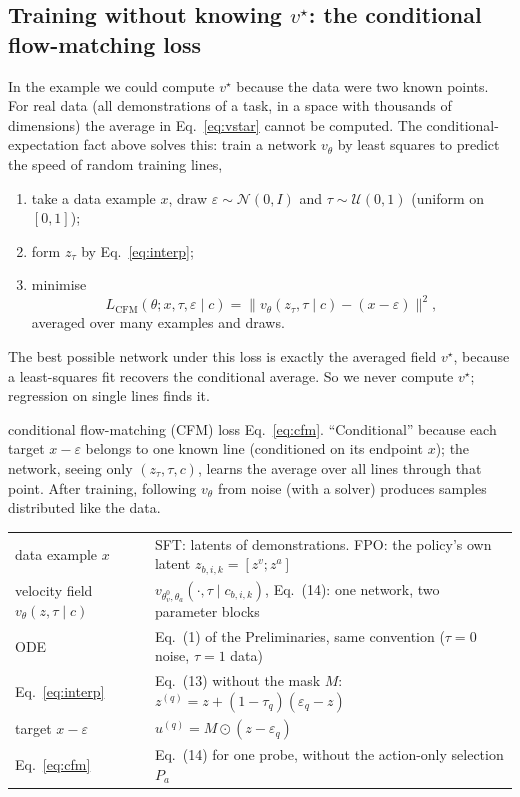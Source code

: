 \documentclass[11pt,a4paper]{article}
\newcommand{\N}{\mathcal{N}}
\newcommand{\Lc}{L_{\mathrm{CFM}}}
\begin{document}
\subsection{Training without knowing $v^\star$: the conditional flow-matching loss}\label{sec:cfm}
In the example we could compute $v^\star$ because the data were two known points. For real data (all demonstrations of a task, in a space with thousands of dimensions) the average in Eq.~\eqref{eq:vstar} cannot be computed. The conditional-expectation fact above solves this: train a network $v_\theta$ by least squares to predict the speed of random training lines,
\begin{enumerate}
\item take a data example $x$, draw $\varepsilon\sim\N(0,I)$ and $\tau\sim\mathcal U(0,1)$ (uniform on $[0,1]$);
\item form $z_\tau$ by Eq.~\eqref{eq:interp};
\item minimise
\begin{equation}
\Lc(\theta;x,\tau,\varepsilon\mid c)=\big\|v_\theta(z_\tau,\tau\mid c)-(x-\varepsilon)\big\|^2 ,
\label{eq:cfm}
\end{equation}
averaged over many examples and draws.
\end{enumerate}
The best possible network under this loss is exactly the averaged field $v^\star$, because a least-squares fit recovers the conditional average. So we never compute $v^\star$; regression on single lines finds it.

\begin{newc}{conditional flow-matching (CFM) loss}
Eq.~\eqref{eq:cfm}. ``Conditional'' because each target $x-\varepsilon$ belongs to one known line (conditioned on its endpoint $x$); the network, seeing only $(z_\tau,\tau,c)$, learns the average over all lines through that point. After training, following $v_\theta$ from noise (with a solver) produces samples distributed like the data.
\end{newc}

\begin{paperlink}
\begin{tabular}{@{}l p{10.6cm}@{}}
data example $x$ & SFT: latents of demonstrations. FPO: the policy's own latent $z_{b,i,k}=[z^v;z^a]$\\
velocity field $v_\theta(z,\tau\mid c)$ & $v_{\theta_v^0,\theta_a}(\cdot,\tau\mid c_{b,i,k})$, Eq.~(14): one network, two parameter blocks\\
ODE & Eq.~(1) of the Preliminaries, same convention ($\tau=0$ noise, $\tau=1$ data)\\
Eq.~\eqref{eq:interp} & Eq.~(13) without the mask $M$: $z^{(q)}=z+(1-\tau_q)(\varepsilon_q-z)$\\
target $x-\varepsilon$ & $u^{(q)}=M\odot(z-\varepsilon_q)$\\
Eq.~\eqref{eq:cfm} & Eq.~(14) for one probe, without the action-only selection $P_a$\\
\end{tabular}
\end{paperlink}
\end{document}
